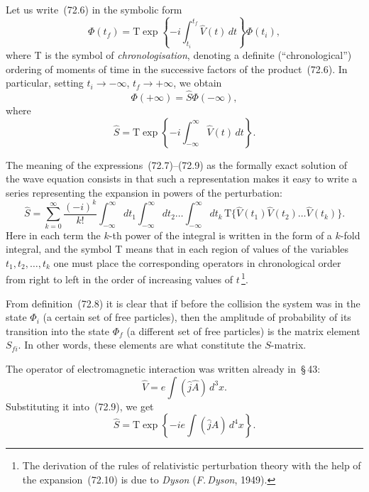 Let us write~(72.6) in the symbolic form
\begin{equation}
\Phi(t_f) = \mathrm{T}\exp\left\{-i\int_{t_i}^{t_f}\hat{V}(t)\,dt\right\}\Phi(t_i),
\tag{72.7}
\end{equation}
where T is the symbol of \textit{chronologisation}, denoting a definite (``chronological'') ordering of moments of time in the successive factors of the product~(72.6). In particular, setting $t_i \to -\infty$, $t_f \to +\infty$, we obtain
\begin{equation}
\Phi(+\infty) = \hat{S}\Phi(-\infty),
\tag{72.8}
\label{eq:72.8}
\end{equation}
where
\begin{equation}
\hat{S} = \mathrm{T}\exp\left\{-i\int_{-\infty}^{\infty}\hat{V}(t)\,dt\right\}.
\tag{72.9}
\end{equation}

The meaning of the expressions~(72.7)--(72.9) as the formally exact solution of the wave equation consists in that such a representation makes it easy to write a series representing the expansion in powers of the perturbation:
\begin{equation}
\hat{S} = \sum_{k=0}^{\infty}\frac{(-i)^k}{k!}\int_{-\infty}^{\infty}dt_1\int_{-\infty}^{\infty}dt_2\ldots\int_{-\infty}^{\infty}dt_k\,\mathrm{T}\{\hat{V}(t_1)\hat{V}(t_2)\ldots\hat{V}(t_k)\}.
\tag{72.10}
\label{eq:72.10}
\end{equation}
Here in each term the $k$-th power of the integral is written in the form of a $k$-fold integral, and the symbol T means that in each region of values of the variables $t_1, t_2, \ldots, t_k$ one must place the corresponding operators in chronological order from right to left in the order of increasing values of $t$\,\footnote{The derivation of the rules of relativistic perturbation theory with the help of the expansion~(72.10) is due to \textit{Dyson} (\textit{F.\,Dyson}, 1949).}.

From definition~(72.8) it is clear that if before the collision the system was in the state $\Phi_i$ (a certain set of free particles), then the amplitude of probability of its transition into the state $\Phi_f$ (a different set of free particles) is the matrix element $S_{fi}$. In other words, these elements are what constitute the $S$-matrix.

The operator of electromagnetic interaction was written already in~\S\,43:
\begin{equation}
\hat{V} = e\int(\hat{j}\hat{A})\,d^3x.
\tag{72.11}
\end{equation}
Substituting it into~(72.9), we get
\begin{equation}
\hat{S} = \mathrm{T}\exp\left\{-ie\int(\hat{j}\hat{A})\,d^4x\right\}.
\tag{72.12}
\end{equation}

